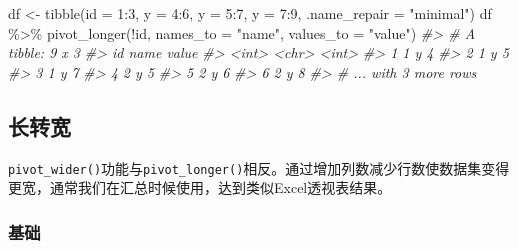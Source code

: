 \documentclass[
]{book}
\newenvironment{Shaded}{\begin{snugshade}}{\end{snugshade}}
\newcommand{\AttributeTok}[1]{\textcolor[rgb]{0.77,0.63,0.00}{#1}}
\newcommand{\CommentTok}[1]{\textcolor[rgb]{0.56,0.35,0.01}{\textit{#1}}}
\newcommand{\DecValTok}[1]{\textcolor[rgb]{0.00,0.00,0.81}{#1}}
\newcommand{\FunctionTok}[1]{\textcolor[rgb]{0.00,0.00,0.00}{#1}}
\newcommand{\NormalTok}[1]{#1}
\newcommand{\OtherTok}[1]{\textcolor[rgb]{0.56,0.35,0.01}{#1}}
\newcommand{\SpecialCharTok}[1]{\textcolor[rgb]{0.00,0.00,0.00}{#1}}
\newcommand{\StringTok}[1]{\textcolor[rgb]{0.31,0.60,0.02}{#1}}
\begin{document}
\begin{Shaded}
\begin{Highlighting}[]
\NormalTok{df }\OtherTok{\textless{}{-}} \FunctionTok{tibble}\NormalTok{(}\AttributeTok{id =} \DecValTok{1}\SpecialCharTok{:}\DecValTok{3}\NormalTok{, }\AttributeTok{y =} \DecValTok{4}\SpecialCharTok{:}\DecValTok{6}\NormalTok{, }\AttributeTok{y =} \DecValTok{5}\SpecialCharTok{:}\DecValTok{7}\NormalTok{, }\AttributeTok{y =} \DecValTok{7}\SpecialCharTok{:}\DecValTok{9}\NormalTok{, }\AttributeTok{.name\_repair =} \StringTok{"minimal"}\NormalTok{)}
\NormalTok{df }\SpecialCharTok{\%\textgreater{}\%} \FunctionTok{pivot\_longer}\NormalTok{(}\SpecialCharTok{!}\NormalTok{id, }\AttributeTok{names\_to =} \StringTok{"name"}\NormalTok{, }\AttributeTok{values\_to =} \StringTok{"value"}\NormalTok{)}
\CommentTok{\#\textgreater{} \# A tibble: 9 x 3}
\CommentTok{\#\textgreater{}      id name  value}
\CommentTok{\#\textgreater{}   \textless{}int\textgreater{} \textless{}chr\textgreater{} \textless{}int\textgreater{}}
\CommentTok{\#\textgreater{} 1     1 y         4}
\CommentTok{\#\textgreater{} 2     1 y         5}
\CommentTok{\#\textgreater{} 3     1 y         7}
\CommentTok{\#\textgreater{} 4     2 y         5}
\CommentTok{\#\textgreater{} 5     2 y         6}
\CommentTok{\#\textgreater{} 6     2 y         8}
\CommentTok{\#\textgreater{} \# ... with 3 more rows}
\end{Highlighting}
\end{Shaded}

\hypertarget{ux957fux8f6cux5bbd}{%
\subsection{长转宽}\label{ux957fux8f6cux5bbd}}

\texttt{pivot\_wider()}功能与\texttt{pivot\_longer()}相反。通过增加列数减少行数使数据集变得更宽，通常我们在汇总时候使用，达到类似Excel透视表结果。

\hypertarget{ux57faux7840-2}{%
\subsubsection{基础}\label{ux57faux7840-2}}
\end{document}
